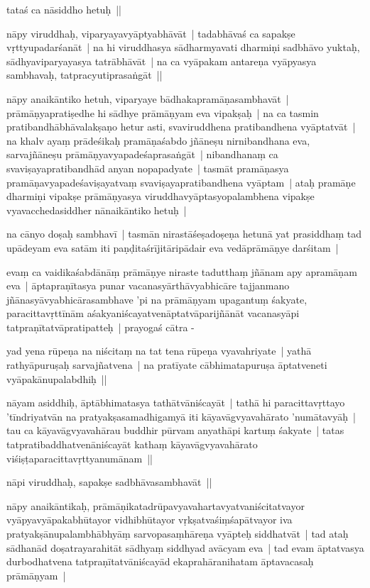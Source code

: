 \documentclass[article,12pt,a4paper]{memoir}
\begin{document}
	  \pstart tataś ca nāsiddho hetuḥ ||
	\pend
      

	  \pstart nāpy viruddhaḥ, viparyayavyāptyabhāvāt | tadabhāvaś ca sapakṣe vṛttyupadarśanāt | na hi viruddhasya sādharmyavati dharmiṇi sadbhāvo yuktaḥ, sādhyaviparyayasya tatrābhāvāt | na ca vyāpakam antareṇa vyāpyasya sambhavaḥ, tatpracyutiprasaṅgāt || 
	\pend
      

	  \pstart nāpy anaikāntiko hetuh, viparyaye bādhakapramāṇasambhavāt | prāmāṇyapratiṣedhe hi sādhye prāmāṇyam eva vipakṣaḥ | na ca tasmin pratibandhābhāvalakṣaṇo hetur asti, svaviruddhena pratibandhena vyāptatvāt | na khalv ayaṃ prādeśikaḥ pramāṇaśabdo jñāneṣu nirnibandhana eva, sarvajñāneṣu prāmāṇyavyapadeśaprasaṅgāt | nibandhanaṃ ca svaviṣayapratibandhād anyan nopapadyate | tasmāt pramāṇasya pramāṇavyapadeśaviṣayatvaṃ svaviṣayapratibandhena vyāptam | ataḥ pramāṇe dharmiṇi vipakṣe prāmāṇyasya viruddhavyāptasyopalambhena vipakṣe vyavacchedasiddher nānaikāntiko hetuḥ |
	\pend
      

	  \pstart na cānyo doṣaḥ sambhavī | tasmān nirastāśeṣadoṣeṇa hetunā yat prasiddhaṃ tad upādeyam eva satām iti paṇḍitaśrījitāripādair eva vedāprāmāṇye darśitam | 
	\pend
      

	  \pstart evaṃ ca vaidikaśabdānāṃ prāmāṇye niraste tadutthaṃ jñānam apy apramāṇam eva | āptapraṇītasya punar vacanasyārthāvyabhicāre tajjanmano jñānasyāvyabhicārasambhave 'pi na prāmāṇyam upagantuṃ śakyate, paracittavṛttīnām aśakyaniścayatvenāptatvāparijñānāt vacanasyāpi tatpraṇītatvāpratipatteḥ | prayogaś cātra -
	\pend
      

	  \pstart yad yena rūpeṇa na niścitaṃ na tat tena rūpeṇa vyavahriyate | yathā rathyāpuruṣaḥ sarvajñatvena | na pratīyate cābhimatapuruṣa āptatveneti vyāpakānupalabdhiḥ || 
	\pend
      

	  \pstart nāyam asiddhiḥ, āptābhimatasya tathātvāniścayāt | tathā hi paracittavṛttayo 'tīndriyatvān na pratyakṣasamadhigamyā iti kāyavāgvyavahārato 'numātavyāḥ | tau ca kāyavāgvyavahārau buddhir pūrvam anyathāpi kartuṃ śakyate | tatas tatpratibaddhatvenāniścayāt kathaṃ kāyavāgvyavahārato viśiṣṭaparacittavṛttyanumānam ||
	\pend
      

	  \pstart nāpi viruddhaḥ, sapakṣe sadbhāvasambhavāt ||
	\pend
      

	  \pstart nāpy anaikāntikaḥ, prāmāṇikatadrūpavyavahartavyatvaniścitatvayor vyāpyavyāpakabhūtayor vidhibhūtayor vṛkṣatvaśiṃśapātvayor iva pratyakṣānupalambhābhyāṃ sarvopasaṃhāreṇa vyāpteḥ siddhatvāt | tad ataḥ sādhanād doṣatrayarahitāt sādhyaṃ siddhyad avācyam eva | tad evam āptatvasya durbodhatvena tatpraṇītatvāniścayād ekaprahāranihatam āptavacasaḥ prāmāṇyam |
	\pend
      
\end{document}
